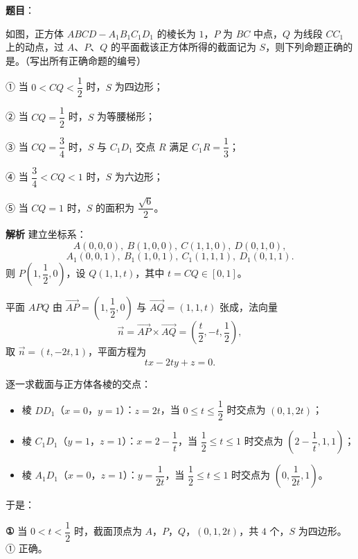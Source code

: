 \begin{answer}

\textbf{题目}：

如图，正方体 $ABCD-A_1B_1C_1D_1$ 的棱长为 $1$，$P$ 为 $BC$ 中点，$Q$ 为线段 $CC_1$ 上的动点，过 $A$、$P$、$Q$ 的平面截该正方体所得的截面记为 $S$，则下列命题正确的是\gkblank{}。（写出所有正确命题的编号）
\nopagebreak[4]
\begin{center}\end{center}
\nopagebreak[4]
① 当 $0<CQ<\dfrac12$ 时，$S$ 为四边形；

② 当 $CQ=\dfrac12$ 时，$S$ 为等腰梯形；

③ 当 $CQ=\dfrac34$ 时，$S$ 与 $C_1D_1$ 交点 $R$ 满足 $C_1R=\dfrac13$；

④ 当 $\dfrac34<CQ<1$ 时，$S$ 为六边形；

⑤ 当 $CQ=1$ 时，$S$ 的面积为 $\dfrac{\sqrt6}{2}$。

\textbf{解析}
建立坐标系：
\nopagebreak[4]
\[A(0,0,0),\ B(1,0,0),\ C(1,1,0),\ D(0,1,0),\]
\nopagebreak[4]
\[A_1(0,0,1),\ B_1(1,0,1),\ C_1(1,1,1),\ D_1(0,1,1).\]
则 $P\left(1,\dfrac12,0\right)$，设 $Q(1,1,t)$，其中 $t=CQ\in[0,1]$。

平面 $APQ$ 由 $\overrightarrow{AP}=\left(1,\dfrac12,0\right)$ 与 $\overrightarrow{AQ}=(1,1,t)$ 张成，法向量
\nopagebreak[4]
\[\vec n=\overrightarrow{AP}\times\overrightarrow{AQ}
=\left(\frac t2,-t,\frac12\right),\]
取 $\vec n=(t,-2t,1)$，平面方程为
\nopagebreak[4]
\[tx-2ty+z=0.\]

逐一求截面与正方体各棱的交点：

\begin{itemize}
\item 棱 $DD_1$（$x=0$，$y=1$）：$z=2t$，当 $0\leqslant t\leqslant\dfrac12$ 时交点为 $\left(0,1,2t\right)$；
\item 棱 $C_1D_1$（$y=1$，$z=1$）：$x=2-\dfrac1t$，当 $\dfrac12\leqslant t\leqslant1$ 时交点为 $\left(2-\dfrac1t,1,1\right)$；
\item 棱 $A_1D_1$（$x=0$，$z=1$）：$y=\dfrac1{2t}$，当 $\dfrac12\leqslant t\leqslant1$ 时交点为 $\left(0,\dfrac1{2t},1\right)$。
\end{itemize}

于是：

\textbf{①} 当 $0<t<\dfrac12$ 时，截面顶点为 $A$，$P$，$Q$，$\left(0,1,2t\right)$，共 $4$ 个，$S$ 为四边形。① 正确。


\end{answer}
